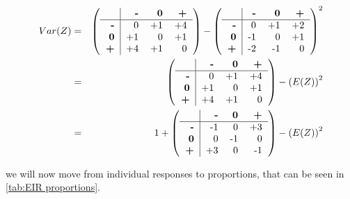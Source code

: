 \documentclass{article}[]
\begin{document}
\begin{eqnarray*}
Var(Z) &=& 
\left(\begin{tabular}{r|r r r}
                & \textbf{-} & \textbf{0} & \textbf{+} \\\hline
    \textbf{-}     & 0        & +1    & +4    \\
    \textbf{0}     & +1    & 0        & +1    \\
    \textbf{+}     & +4    & +1    & 0        \\
\end{tabular} \right)
- \left(
\begin{tabular}{r|r r r}
                & \textbf{-} & \textbf{0} & \textbf{+} \\\hline
    \textbf{-}     & 0        & +1    & +2    \\
    \textbf{0}     & -1    & 0        & +1    \\
    \textbf{+}     & -2    & -1    & 0        \\
\end{tabular}
\right)^2  \\
&=& \left( \begin{tabular}{r|r r r}
                & \textbf{-} & \textbf{0} & \textbf{+} \\\hline
    \textbf{-}     & 0        & +1    & +4    \\
    \textbf{0}     & +1    & 0        & +1    \\
    \textbf{+}     & +4    & +1    & 0        \\
\end{tabular} \right)
- \left(E(Z)\right)^2     \\
&=& 1 +  \left(\begin{tabular}{r|r r r}
                & \textbf{-} & \textbf{0} & \textbf{+} \\\hline
    \textbf{-}     & -1    & 0        & +3    \\
    \textbf{0}     & 0        & -1    & 0    \\
    \textbf{+}     & +3    & 0        & -1        \\
\end{tabular} \right)
 - \left(E(Z)\right)^2    \\
\end{eqnarray*}




we will now move from individual responses to proportions, that can be seen in \autoref{tab:EIR proportions}.
\end{document}
